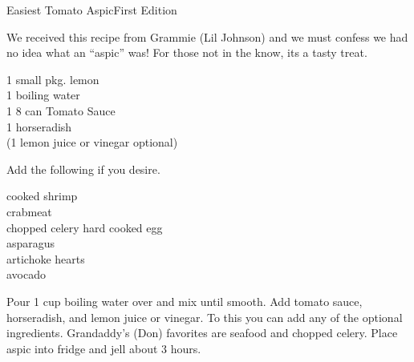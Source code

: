 \begin{entry}{Easiest Tomato Aspic}{First Edition}

\begin{open}
  We received this recipe from Grammie (Lil Johnson) and we must confess
  we had no idea what an ``aspic'' was!  For those not in the know, its a tasty
  treat.
\end{open}
\begin{ingredients}
  1 small pkg. lemon \\
  \SI{1}{\cup} boiling water \\
  1 \SI{8}{\ounce} can  Tomato Sauce \\
  \SI{1}{\teaspoon} horseradish \\
  (\SI{1}{\teaspoon} lemon juice or vinegar optional)
\end{ingredients}
Add the following if you desire.
\begin{ingredients}
  cooked shrimp \\
  crabmeat \\
  chopped celery
  hard cooked egg \\
  asparagus \\
  artichoke hearts \\
  avocado
\end{ingredients}
Pour 1 cup boiling water over  and mix until smooth. Add tomato
sauce, horseradish, and lemon juice or vinegar.  To this you can add any of
the optional ingredients. Grandaddy's (Don) favorites are seafood and chopped
celery. Place aspic into fridge and jell about 3 hours.
\end{entry}

